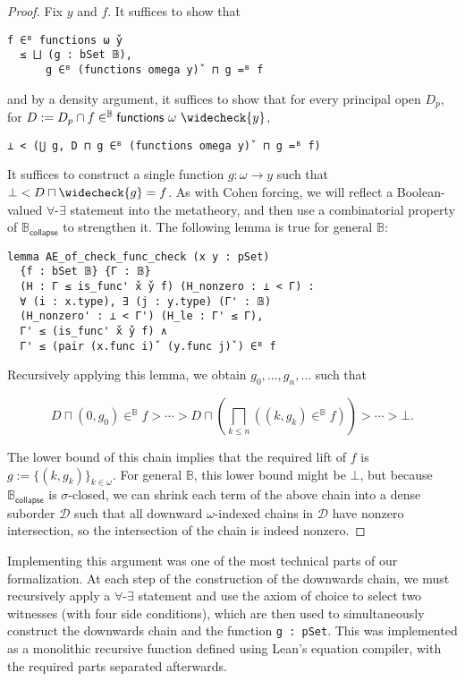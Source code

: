 \documentclass[sigplan,screen]{acmart}
\newcommand{\B}{\mathbb{B}}
\theoremstyle{definition}
\begin{document}
\begin{proof}
  Fix \(y\) and \(f\). It suffices to show that
\begin{lstlisting}
f ∈ᴮ functions ω y̌
  ≤ ⨆ (g : bSet 𝔹),
      g ∈ᴮ (functions omega y)̌  ⊓ g =ᴮ f
\end{lstlisting}
  and by a density argument, it suffices to show that for every principal open \(D_p\), for \(D := D_p \cap f \in^{\B} \mathsf{functions}\ \omega \ \widecheck{y}\),
\begin{lstlisting}
⊥ < (⋃ g, D ⊓ g ∈ᴮ (functions omega y)̌  ⊓ g =ᴮ f)
\end{lstlisting}
  It suffices to construct a single function \(g : \omega \to y\) such that \(\bot < D \sqcap \widecheck{g} = f\).
  As with Cohen forcing, we will reflect a Boolean-valued \(\forall\)-\(\exists\) statement into the metatheory, and then use a combinatorial property of \(\mathbb{B}_{\mathsf{collapse}}\) to strengthen it.
  The following lemma is true for general \(\mathbb{B}\):
\begin{lstlisting}
lemma AE_of_check_func_check (x y : pSet)
  {f : bSet 𝔹} {Γ : 𝔹}
  (H : Γ ≤ is_func' x̌ y̌ f) (H_nonzero : ⊥ < Γ) :
  ∀ (i : x.type), ∃ (j : y.type) (Γ' : 𝔹)
  (H_nonzero' : ⊥ < Γ') (H_le : Γ' ≤ Γ),
  Γ' ≤ (is_func' x̌ y̌ f) ∧
  Γ' ≤ (pair (x.func i)̌  (y.func j)̌ ) ∈ᴮ f
\end{lstlisting}
Recursively applying this lemma, we obtain \(g_0, \dots, g_n, \dots\) such that

\[D \sqcap (0 , g_0) \in^{\mathbb{B}} f > \cdots > D \sqcap \left(\bigsqcap_{k \leq n} ((k, g_k) \in^{\mathbb{B}} f)\right) > \cdots > \bot. \]

The lower bound of this chain implies that the required lift of \(f\) is
\(g := \{(k, g_k)\}_{k \in \omega}\).
For general \(\mathbb{B}\), this lower bound might be \(\bot\), but because \(\mathbb{B}_{\mathsf{collapse}}\) is \(\sigma\)-closed,
we can shrink each term of the above chain into a dense suborder \(\mathcal{D}\) such that all downward \(\omega\)-indexed chains in \(\mathcal{D}\) have nonzero intersection, so the intersection of the chain is indeed nonzero.
\end{proof}

Implementing this argument was one of the most technical parts of our formalization. At each step of the construction of the downwards chain, we must recursively apply a \(\forall\)-\(\exists\) statement and use the axiom of choice to select two witnesses (with four side conditions), which are then used to simultaneously construct the downwards chain and the function \lstinline{g : pSet}. This was implemented as a monolithic recursive function defined using Lean's equation compiler, with the required parts separated afterwards.
\end{document}
